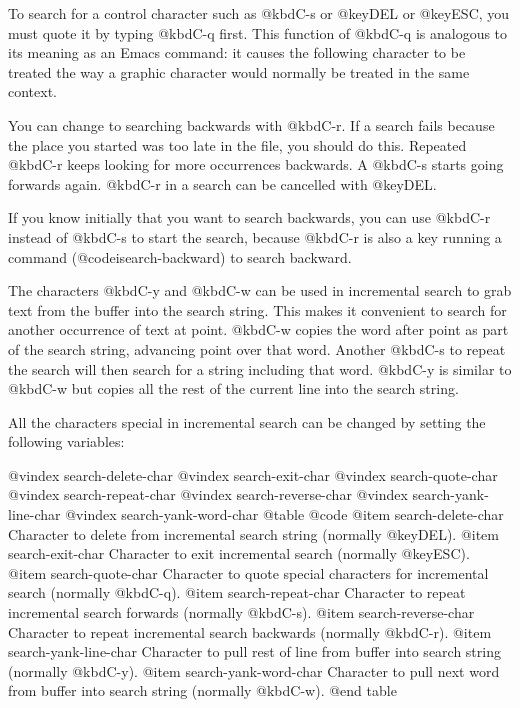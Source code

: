 {{{{{{{{  To search for a control character such as @kbd{C-s} or @key{DEL} or @key{ESC},
you must quote it by typing @kbd{C-q} first.  This function of @kbd{C-q} is
analogous to its meaning as an Emacs command: it causes the following
character to be treated the way a graphic character would normally be
treated in the same context.

  You can change to searching backwards with @kbd{C-r}.  If a search fails
because the place you started was too late in the file, you should do this.
Repeated @kbd{C-r} keeps looking for more occurrences backwards.  A
@kbd{C-s} starts going forwards again.  @kbd{C-r} in a search can be cancelled
with @key{DEL}.

  If you know initially that you want to search backwards, you can
use @kbd{C-r} instead of @kbd{C-s} to start the search, because @kbd{C-r}
is also a key running a command (@code{isearch-backward}) to search
backward.

  The characters @kbd{C-y} and @kbd{C-w} can be used in incremental search
to grab text from the buffer into the search string.  This makes it
convenient to search for another occurrence of text at point.  @kbd{C-w}
copies the word after point as part of the search string, advancing
point over that word.  Another @kbd{C-s} to repeat the search will then
search for a string including that word.  @kbd{C-y} is similar to @kbd{C-w}
but copies all the rest of the current line into the search string.

  All the characters special in incremental search can be changed by setting
the following variables:

@vindex search-delete-char
@vindex search-exit-char
@vindex search-quote-char
@vindex search-repeat-char
@vindex search-reverse-char
@vindex search-yank-line-char
@vindex search-yank-word-char
@table @code
@item search-delete-char
Character to delete from incremental search string (normally @key{DEL}).
@item search-exit-char
Character to exit incremental search (normally @key{ESC}).
@item search-quote-char
Character to quote special characters for incremental search (normally
@kbd{C-q}).
@item search-repeat-char
Character to repeat incremental search forwards (normally @kbd{C-s}).
@item search-reverse-char
Character to repeat incremental search backwards (normally @kbd{C-r}).
@item search-yank-line-char
Character to pull rest of line from buffer into search string
(normally @kbd{C-y}).
@item search-yank-word-char
Character to pull next word from buffer into search string (normally
@kbd{C-w}).
@end table

}}}}}}}}
